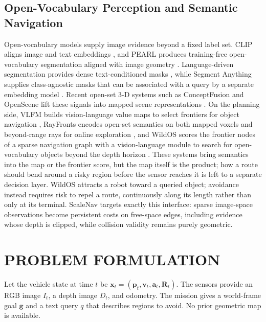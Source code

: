 \documentclass[letterpaper,10pt,conference]{ieeeconf}
\newcommand{\vect}[1]{\boldsymbol{#1}}
\begin{document}
\subsection{Open-Vocabulary Perception and Semantic Navigation}
Open-vocabulary models supply image evidence beyond a fixed label set.
CLIP aligns image and text embeddings \cite{clip}, and PEARL produces
training-free open-vocabulary segmentation aligned with image geometry
\cite{pearl}.
Language-driven segmentation provides dense text-conditioned masks
\cite{lseg}, while Segment Anything supplies class-agnostic masks that can be
associated with a query by a separate embedding model \cite{sam}.  Recent
open-set 3-D systems such as ConceptFusion and OpenScene lift these signals
into mapped scene representations \cite{conceptfusion,openscene}.
On the planning side, VLFM builds vision-language value maps to select
frontiers for object navigation \cite{vlfm}, RayFronts encodes open-set
semantics on both mapped voxels and beyond-range rays for online
exploration \cite{rayfronts}, and WildOS scores the frontier nodes of a
sparse navigation graph with a vision-language module to search for
open-vocabulary objects beyond the depth horizon \cite{wildos}.
These systems bring semantics into the map or the frontier score, but the
map itself is the product; how a route should bend around a risky region
before the sensor reaches it is left to a separate decision layer.  WildOS
attracts a robot toward a queried object; avoidance instead requires risk to
repel a route, continuously along its length rather than only at its
terminal.  ScaleNav targets exactly this interface: sparse image-space
observations become persistent costs on free-space edges, including evidence
whose depth is clipped, while collision validity remains purely geometric.

\section{PROBLEM FORMULATION}
Let the vehicle state at time $t$ be
$\vect{x}_t=(\vect{p}_t,\vect{v}_t,\vect{a}_t,\vect{R}_t)$.
The sensors provide an RGB image $I_t$, a depth image $D_t$, and
odometry.
The mission gives a world-frame goal $\vect{g}$ and a text query $q$ that
describes regions to avoid.
No prior geometric map is available.
\end{document}
